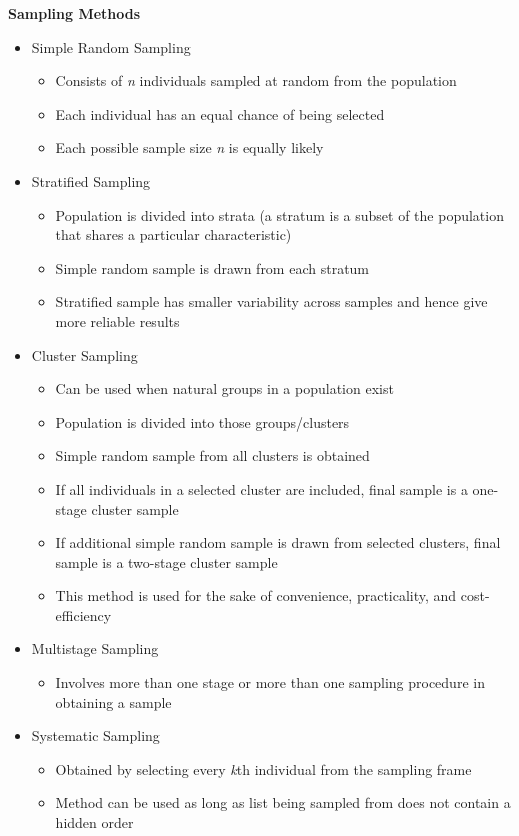 \documentclass{article}
\begin{document}
\textbf{Sampling Methods}
\begin{itemize}
    \item Simple Random Sampling
    \begin{itemize}
        \item Consists of \emph{n} individuals sampled at random from the population
        \item Each individual has an equal chance of being selected
        \item Each possible sample size \emph{n} is equally likely
    \end{itemize}
    \item Stratified Sampling
    \begin{itemize}
        \item Population is divided into strata (a stratum is a subset of the population that shares a particular characteristic)
        \item Simple random sample is drawn from each stratum
        \item Stratified sample has smaller variability across samples and hence give more reliable results 
    \end{itemize}
    \item Cluster Sampling
    \begin{itemize}
        \item Can be used when natural groups in a population exist
        \item Population is divided into those groups/clusters
        \item Simple random sample from all clusters is obtained
        \item If all individuals in a selected cluster are included, final sample is a one-stage cluster sample
        \item If additional simple random sample is drawn from selected clusters, final sample is a two-stage cluster sample
        \item This method is used for the sake of convenience, practicality, and cost-efficiency
    \end{itemize}
    \item Multistage Sampling
    \begin{itemize}
        \item Involves more than one stage or more than one sampling procedure in obtaining a sample
    \end{itemize}
    \item Systematic Sampling
    \begin{itemize}
        \item Obtained by selecting every \emph{k}th individual from the sampling frame
        \item Method can be used as long as list being sampled from does not contain a hidden order
    \end{itemize}
\end{itemize}
\end{document}
